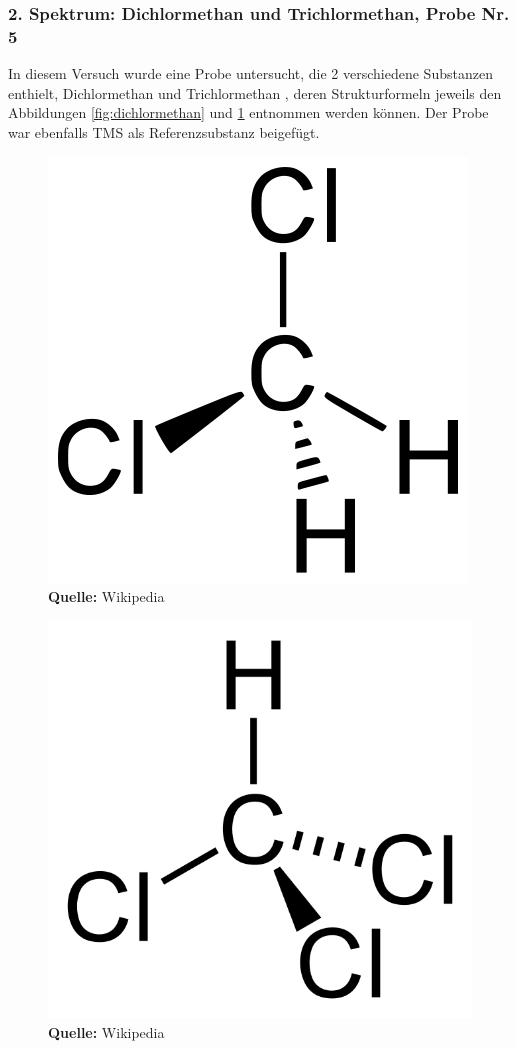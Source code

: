 \documentclass[a4paper,titlepage]{scrartcl}
\numberwithin{equation}{section}
\begin{document}
\subsubsection{2. Spektrum: Dichlormethan und Trichlormethan, Probe Nr. 5}
In diesem Versuch wurde eine Probe untersucht, die 2 verschiedene Substanzen enthielt, Dichlormethan  und Trichlormethan , deren Strukturformeln jeweils den Abbildungen \ref{fig:dichlormethan} und \ref{fig:trichlormethan} entnommen werden können. Der Probe war ebenfalls TMS als Referenzsubstanz beigefügt.
\begin{figure}[H]
\centering
\begin{minipage}{.35\textwidth}
	\centering
  	\includegraphics[width=.5\linewidth]{images/dichlormethan.png}\\
  	\footnotesize\sffamily\textbf{Quelle:} Wikipedia \cite{wiki:dichlormethan}
    \captionsetup{width=0.8\textwidth}
  	\label{fig:dichlormethan}
\end{minipage}%
\begin{minipage}{.35\textwidth}
	\centering
	\includegraphics[width=.5\linewidth]{images/trichlormethan.png}\\
	\footnotesize\sffamily\textbf{Quelle:} Wikipedia \cite{wiki:trichlormethan}
	\captionsetup{width=0.8\textwidth}
	\label{fig:trichlormethan}
\end{minipage}
\end{figure}
\end{document}
